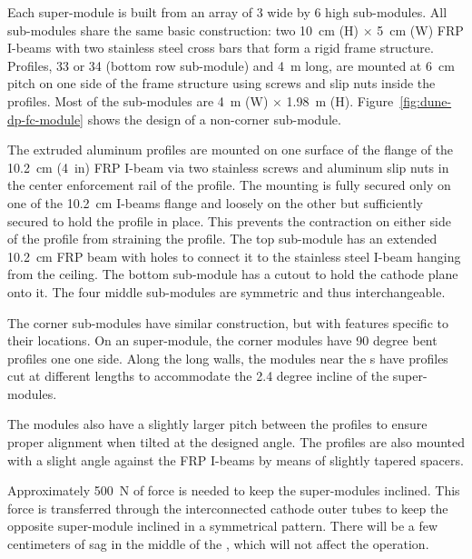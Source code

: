 Each super-module is built from an array of \num{3} wide by \num{6} high sub-modules. All sub-modules share the same basic construction: two \SI{10}{\cm} (H) $\times$ \SI{5}{\cm} (W) FRP I-beams with two stainless steel cross bars that form a rigid frame structure. Profiles, \num{33} or \num{34} (bottom row sub-module) and \SI{4}{\m} long, are mounted at \SI{6}{\cm} pitch on one side of the frame structure using screws and slip nuts inside the profiles. Most of the sub-modules are \SI{4}{\m} (W) $\times$ \SI{1.98}{\m} (H). Figure~\ref{fig:dune-dp-fc-module} shows the design of a non-corner  sub-module. 


The extruded aluminum profiles are mounted on one surface of the flange of the \SI{10.2}{\cm} (\SI{4}{in}) FRP I-beam via two stainless screws and aluminum slip nuts in the center enforcement rail of the profile. The mounting is fully secured only on one of the \SI{10.2}{\cm} I-beams flange and loosely on the other but sufficiently secured to hold the profile in place. This prevents the contraction on either side of the profile from straining the profile. The top sub-module has an extended \SI{10.2}{\cm} FRP beam with holes to connect it to the stainless steel I-beam hanging from the ceiling. The bottom sub-module has a cutout to hold the cathode plane onto it. The four middle sub-modules are symmetric and thus interchangeable.


The corner sub-modules have similar construction, but with features specific to their locations. On an \endwall super-module, the corner modules have \num{90} degree bent profiles one one side. Along the long walls, the modules near the \endwall{}s have profiles cut at different lengths to accommodate the \num{2.4} degree incline of the \endwall super-modules.

The \endwall {} modules also have a slightly larger pitch between the  profiles to ensure proper alignment when tilted at the designed angle.  The profiles are also mounted with a slight angle against the FRP I-beams by means of slightly tapered spacers.

Approximately \SI{500}{\N} of force is needed to keep the \endwall {} super-modules inclined. This force is transferred through the interconnected cathode outer tubes to keep the opposite \endwall super-module inclined in a symmetrical pattern. There will be a few centimeters of sag in the middle of the \endwall, which will not affect the  operation.   


